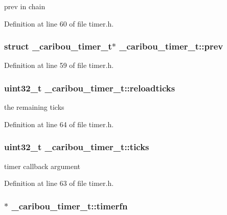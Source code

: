 prev in chain 



Definition at line 60 of file timer.\-h.

\hypertarget{struct__caribou__timer__t_a711f3f84b0ef799261b12d7c0a6d4132}{
\subsubsection[{prev}]{\setlength{\rightskip}{0pt plus 5cm}struct {\bf \-\_\-caribou\-\_\-timer\-\_\-t}$\ast$ \-\_\-caribou\-\_\-timer\-\_\-t\-::prev}}\label{struct__caribou__timer__t_a711f3f84b0ef799261b12d7c0a6d4132}


Definition at line 59 of file timer.\-h.

\hypertarget{struct__caribou__timer__t_a1b66f8c7abf7e00efa3d0adc916b0ecd}{
\subsubsection[{reloadticks}]{\setlength{\rightskip}{0pt plus 5cm}uint32\-\_\-t \-\_\-caribou\-\_\-timer\-\_\-t\-::reloadticks}}\label{struct__caribou__timer__t_a1b66f8c7abf7e00efa3d0adc916b0ecd}


the remaining ticks 



Definition at line 64 of file timer.\-h.

\hypertarget{struct__caribou__timer__t_a94c03a7c23a27aa378b861389b6ee0c8}{
\subsubsection[{ticks}]{\setlength{\rightskip}{0pt plus 5cm}uint32\-\_\-t \-\_\-caribou\-\_\-timer\-\_\-t\-::ticks}}\label{struct__caribou__timer__t_a94c03a7c23a27aa378b861389b6ee0c8}


timer callback argument 



Definition at line 63 of file timer.\-h.

\hypertarget{struct__caribou__timer__t_a036d01df45a585775dd0ef585f90eb7a}{
\subsubsection[{timerfn}]{$\ast$ \-\_\-caribou\-\_\-timer\-\_\-t\-::timerfn}}\label{struct__caribou__timer__t_a036d01df45a585775dd0ef585f90eb7a}


